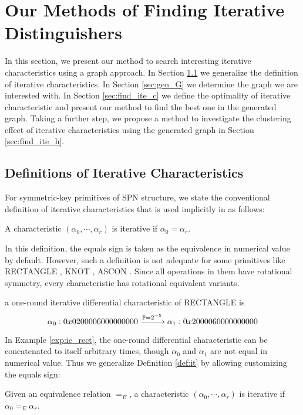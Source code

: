 \section{Our Methods of Finding Iterative Distinguishers}\label{sec:method_ite}

In this section, we present our method to search interesting iterative characteristics using a graph approach. In Section \ref{sec:def-it} we generalize the definition of iterative characteristics. In Section \ref{sec:gen_G} we determine the graph we are interested with. In Section \ref{sec:find_ite_c} we define the optimality of iterative characteristic and present our method to find the best one in the generated graph. Taking a further step, we propose a method to investigate the clustering effect of iterative characteristics using the generated graph in Section \ref{sec:find_ite_h}. 

\subsection{Definitions of Iterative Characteristics}\label{sec:def-it}

For symmetric-key primitives of SPN structure, we state the conventional definition of iterative characteristics that is used implicitly in \cite{wang2008differential,liu2019iterative} as follows:
\begin{definition}\label{def:it}
	A characteristic $(\alpha_0,\cdots,\alpha_r)$ is iterative if $\alpha_0=\alpha_r$.
\end{definition}

In this definition, the equals sign is taken as the equivalence in numerical value by default. However, such a definition is not adequate for some primitives like RECTANGLE \cite{zhang2015rectangle}, KNOT \cite{zhang2019knot}, ASCON \cite{dobraunig2016ascon}. Since all operations in them have rotational symmetry, every characteristic has rotational equivalent variants. 

\begin{example}\label{exp:ic_rect}
    a one-round iterative differential characteristic of RECTANGLE \cite{zhang2015rectangle} is
    \[
        \alpha_0:0x 0200 0060 0000 0000\xrightarrow{\mathbb{P}=2^{-5}}\alpha_1:0x 2000 0600 0000 0000
    \]
\end{example}

In Example \ref{exp:ic_rect}, the one-round differential characteristic can be concatenated to itself arbitrary times, though $\alpha_0$ and $\alpha_1$ are not equal in numerical value. Thus we generalize Definition \ref{def:it} by allowing customizing the equals sign:
\begin{definition}\label{def:git}
	Given an equivalence relation $=_E$, a characteristic $(\alpha_0,\cdots,\alpha_r)$ is iterative if $\alpha_0=_E\alpha_r$.
\end{definition}

